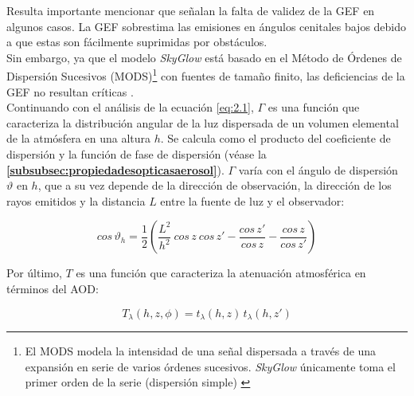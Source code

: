 \begin{table}[htb]
\centering
\caption{Fracción $q$ radiada directamente hacia arriba en el ángulo cenital $z'$ \citep{Kocifaj2007}}
\label{tab:valoresdeq}
\end{table}

Resulta importante mencionar que \cite{Kocifaj2016} señalan la falta de validez de la GEF en algunos casos. La GEF sobrestima las emisiones en ángulos cenitales bajos debido a que estas son fácilmente suprimidas por obstáculos.\\

 Sin embargo, ya que el modelo \textit{SkyGlow} está basado en el Método de Órdenes de Dispersión Sucesivos (MODS)\footnote{El MODS modela la intensidad de una señal dispersada a través de una expansión en serie de varios órdenes sucesivos. \textit{SkyGlow} únicamente toma el primer orden de la serie (dispersión simple) \citep{USENERGY2017}} con fuentes de tamaño finito, las deficiencias de la GEF no resultan críticas \citep{USENERGY2017}.\\

Continuando con el análisis de la ecuación \ref{eq:2.1}, $\Gamma$ es una función que caracteriza la distribución angular de la luz dispersada de un volumen elemental de la atmósfera en una altura $h$. Se calcula como el producto del coeficiente de dispersión y la función de fase de dispersión (véase la \textbf{\autoref{subsubsec:propiedadesopticasaerosol}}). $\Gamma$ varía con el ángulo de dispersión $\vartheta$ en $h$, que a su vez depende de la dirección de observación, la dirección de los rayos emitidos y la distancia $L$ entre la fuente de luz y el observador:

\begin{equation}
cos \, \vartheta_{h} = \frac{1}{2} \left(\frac{L^{2}}{h^{2}} \: cos \, z \: cos \, z' - \frac{cos \, z'}{cos \, z}- \frac{cos \, z}{cos \, z'}\right)
\end{equation}


Por último, $T$ es una función que caracteriza la atenuación atmosférica en términos del AOD:

\begin{equation}
T_{\lambda}(h, z, \phi) = t_{\lambda}(h,z) \, t_{\lambda}(h, z')
\end{equation}

